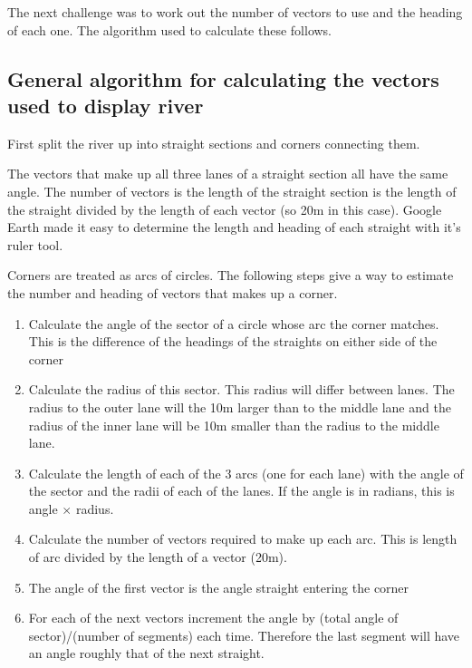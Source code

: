       The next challenge was to work out the number of vectors to use and the heading of each one. The algorithm used to calculate these follows. 
      
      \subsection{General algorithm for calculating the vectors used to display river}
      First split the river up into straight sections and corners connecting them. 
      
      The vectors that make up all three lanes of a straight section all have the same angle. The number of vectors is the length of the straight section is the length of the straight divided by the length of each vector (so 20m in this case). Google Earth made it easy to determine the length and heading of each straight with it's ruler tool.
      
      Corners are treated as arcs of circles. The following steps give a way to estimate the number and heading of  vectors that makes up a corner.
      
      \begin{enumerate}
        \item Calculate the angle of the sector of a circle whose arc the corner matches. This is the difference of the headings of the straights on either side of the corner
        
        \item Calculate the radius of this sector. This radius will differ between lanes. The radius to the outer lane will the 10m larger than to the middle lane and the radius of the inner lane will be 10m smaller than the radius to the middle lane. 
        
        \item Calculate the length of each of the 3 arcs (one for each lane) with the angle of the sector and the radii of each of the lanes. If the angle is in radians, this is angle $\times$ radius.
        
        \item Calculate the number of vectors required to make up each arc. This is length of arc divided by the length of a vector (20m). 
        
        \item The angle of the first vector is the angle straight entering the corner
        
        \item For each of the next vectors increment the angle by (total angle of sector)/(number of segments) each time. Therefore the last segment will have an angle roughly that of the next straight.
      \end{enumerate}
      
